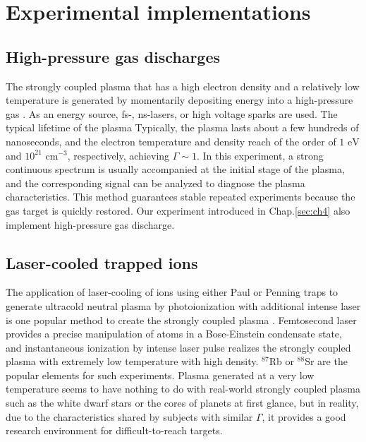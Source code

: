 \section{Experimental implementations}
\label{sec:ch3-3}

\subsection{High-pressure gas discharges}
\label{sec:ch3-3-1}

The strongly coupled plasma that has a high electron density and a relatively low temperature is generated by momentarily depositing energy into a high-pressure gas \cite{tsuda2000calculation, harilal2004spatial, bataller2014blackbody, bataller2016observation}. As an energy source, fs-, ns-lasers, or high voltage sparks are used. The typical lifetime of the plasma Typically, the plasma lasts about a few hundreds of nanoseconds, and the electron temperature and density reach of the order of $1 \text{ eV}$ and $10^{21} \text{ cm}^{-3}$, respectively, achieving $\Gamma \sim 1$. In this experiment, a strong continuous spectrum is usually accompanied at the initial stage of the plasma, and the corresponding signal can be analyzed to diagnose the plasma characteristics. This method guarantees stable repeated experiments because the gas target is quickly restored. Our experiment introduced in Chap.\ref{sec:ch4} also implement high-pressure gas discharge.

\subsection{Laser-cooled trapped ions}
\label{sec:ch3-3-2}

The application of laser-cooling of ions using either Paul \cite{diedrich1987observation, drewsen1998large} or Penning traps \cite{dubin1999trapped} to generate ultracold neutral plasma by photoionization with additional intense laser is one popular method to create the strongly coupled plasma \cite{murillo2004strongly, langin2019laser, kroker2020ultrafast}. Femtosecond laser provides a precise manipulation of atoms in a Bose-Einstein condensate state, and instantaneous ionization by intense laser pulse realizes the strongly coupled plasma with extremely low temperature with high density. $^{87}$Rb or $^{88}$Sr are the popular elements for such experiments. Plasma generated at a very low temperature seems to have nothing to do with real-world strongly coupled plasma such as the white dwarf stars or the cores of planets at first glance, but in reality, due to the characteristics shared by subjects with similar $\Gamma$, it provides a good research environment for difficult-to-reach targets.

